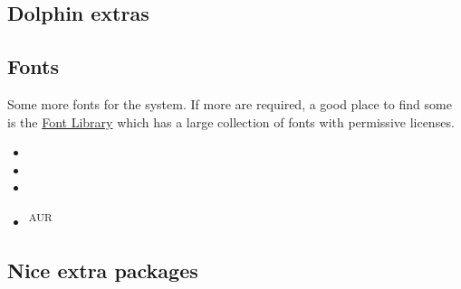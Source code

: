 \subsection{Dolphin extras}


\subsection{Fonts}

Some more fonts for the system. If more are required, a good place to find some is the \href{https://fontlibrary.org/}{Font Library} which has a large collection of fonts with permissive licenses.

\begin{varwidth}[t]{.5\textwidth}
	\begin{itemize}[noitemsep,topsep=0pt,leftmargin=*]
		\item {}
		\item {}
		\item {}
	\end{itemize}
\end{varwidth}
\hspace{4em}
\begin{varwidth}[t]{.5\textwidth}
	\begin{itemize}[noitemsep,topsep=0pt,leftmargin=*]
		\item {}\textsuperscript{AUR}
	\end{itemize}
\end{varwidth}

\subsection{Nice extra packages}

